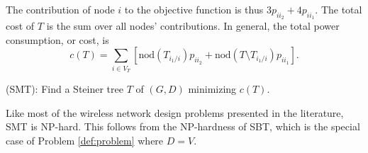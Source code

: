 The contribution of node $i$ to the objective function is thus $3p_{ii_2} + 4p_{ii_1}$.
The total cost of $T$ is the sum over all nodes' contributions.
In general, the total power consumption, or cost, is
$$
c(T) = \sum\limits_{i\in V_T}\left[\text{nod}(T_{i_1/i})p_{ii_2} + \text{nod}(T\setminus T_{i_1/i})p_{ii_1}\right].
$$ 
\begin{problem}
\label{def:problem}
(SMT): Find a Steiner tree $T$ of $(G,D)$ minimizing $c(T)$.
\end{problem}
Like most of the wireless network design problems presented in the literature, SMT is NP-hard. This follows from the NP-hardness of SBT\cite{Papadimitriou06SBT}, which is the special case of Problem \ref{def:problem} where $D=V$.
